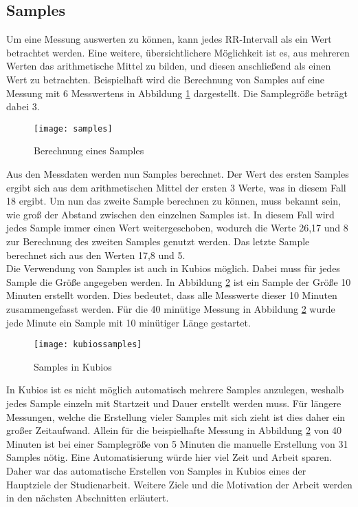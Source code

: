 \subsection{Samples}
Um eine Messung auswerten zu können, kann jedes RR-Intervall als ein Wert betrachtet werden. Eine weitere, übersichtlichere Möglichkeit ist es, aus mehreren Werten das arithmetische Mittel zu bilden, und diesen anschließend als einen Wert zu betrachten. Beispielhaft wird die Berechnung von Samples auf eine Messung mit 6 Messwertens in Abbildung \ref{fig:samples} dargestellt. Die Samplegröße beträgt dabei 3.
 \begin{figure}[H]
	\centering
	\texttt{[image: samples]}
	\caption{Berechnung eines Samples}
	\label{fig:samples}
\end{figure}
Aus den Messdaten werden nun Samples berechnet. Der Wert des ersten Samples ergibt sich aus dem arithmetischen Mittel der ersten 3 Werte, was in diesem Fall 18 ergibt. Um nun das zweite Sample berechnen zu können, muss bekannt sein, wie groß der Abstand zwischen den einzelnen Samples ist. In diesem Fall wird jedes Sample immer einen Wert weitergeschoben, wodurch die Werte 26,17 und 8 zur Berechnung des zweiten Samples genutzt werden. Das letzte Sample berechnet sich aus den Werten 17,8 und 5.\\

Die Verwendung von Samples ist auch in Kubios möglich. Dabei muss für jedes Sample  die Größe angegeben werden. In Abbildung \ref{fig:kubiossamples} ist ein Sample der Größe 10 Minuten erstellt worden. Dies bedeutet, dass alle Messwerte dieser 10 Minuten zusammengefasst werden. Für die 40 minütige Messung in Abbildung \ref{fig:kubiossamples} wurde jede Minute ein Sample mit 10 minütiger Länge gestartet.\\

 \begin{figure}[H]
	\centering
	\texttt{[image: kubiossamples]}
	\caption{Samples in Kubios}
	\label{fig:kubiossamples}
\end{figure}

In Kubios ist es nicht möglich automatisch mehrere Samples anzulegen, weshalb jedes Sample einzeln mit Startzeit und Dauer erstellt werden muss. Für längere Messungen, welche die Erstellung vieler Samples mit sich zieht ist dies daher ein großer Zeitaufwand. Allein für die beispielhafte Messung in Abbildung \ref{fig:kubiossamples} von 40 Minuten ist bei einer Samplegröße von 5 Minuten die manuelle Erstellung von 31 Samples nötig. Eine Automatisierung würde hier viel Zeit und Arbeit sparen. Daher war das automatische Erstellen von Samples in Kubios eines der Hauptziele der Studienarbeit. Weitere Ziele und die Motivation der Arbeit werden in den nächsten Abschnitten erläutert.